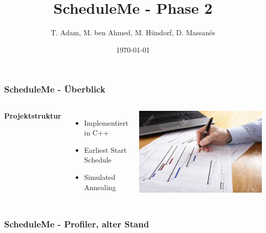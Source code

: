 \documentclass[aspectratio=169]{beamer}
\title[ScheduleMe]{ScheduleMe - Phase 2} %
\author{T. Adam, M. ben Ahmed, M. Hündorf, D. Massanés} %
\institute[UOS] %
{

Universität Osnabrück \\ %

\medskip
\textit{Ressourcenbeschränkte Projektplanung} %


}
\date{\today} %
\begin{document}
\begin{frame}
\titlepage %
\end{frame}


\begin{frame}
	\frametitle{ScheduleMe - Überblick}
	\begin{columns}[c] %
		
		\textbf{Projektstruktur}
		\begin{itemize}
			\item Implementiert in C++
			\item Earliest Start Schedule
			\item Simulated Annealing
		\end{itemize}
		\includegraphics[scale=.5]{../images/stock.jpg}
	\end{columns}
\end{frame}
  

\begin{frame}
\frametitle{ScheduleMe - Profiler, alter Stand}
\end{frame}
	
	
\end{document}
